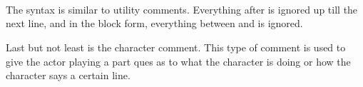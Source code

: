 \documentclass{book}
\begin{document}
\begin{SSCodeBox}
\scitea{} \\
 \\
 \\
 \\
\scitea{} \\
\scitea{} \\
\scitea{\{} \\
\scitea{\hspace*{4em}}
\scitea{;} \\
\scitea{\hspace*{4em}} \\
\scitea{\hspace*{4em}}
\scitea{=} \\
 \\
 \\
 \\
\scitea{\}}
\end{SSCodeBox}

The syntax is similar to utility comments.  Everything after \SSCode{/>} is ignored up till the next line, and in the block form, everything between  and  is ignored.

 Last but not least is the character comment.  This type of comment is used to give the actor playing a part ques as to what the character is doing or how the character says a certain line.

\begin{SSCodeBox}
\scitea{\{} \\
\scitea{\hspace*{4em}}
\scitea{} \\
\scitea{\hspace*{4em}}
\scitea{;} \\
\scitea{\}}
\end{SSCodeBox}
\end{document}
